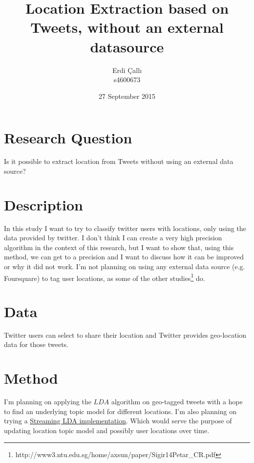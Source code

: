 \documentclass[a4paper]{article}
\title{Location Extraction based on Tweets, without an external datasource}
\author{Erdi \c{C}all{\i}\\s4600673}
\date{27 September 2015}
\begin{document}
\maketitle
\section*{Research Question}
Is it possible to extract location from Tweets without using an external data source?
\section*{Description}
In this study I want to try to classify twitter users with locations, only using the data provided by twitter. I don't think I can create a very high precision algorithm in the context of this research, but I want to show that, using this method, we can get to a precision and I want to discuss how it can be improved or why it did not work. I'm not planning on using any external data source (e.g. Foursquare) to tag user locations, as some of the other studies\footnote{http://www3.ntu.edu.sg/home/axsun/paper/Sigir14Petar\_CR.pdf} do. 
\section*{Data}
Twitter users can select to share their location and Twitter provides geo-location data for those tweets.
\section*{Method}
I'm planning on applying the $LDA$ algorithm on geo-tagged tweets with a hope to find an underlying topic model for different locations. I'm also planning on trying a \href{https://github.com/kzhai/InfVocLDA}{\underline{Streaming LDA implementation}}. Which would serve the purpose of updating location topic model and possibly user locations over time.
\end{document}
